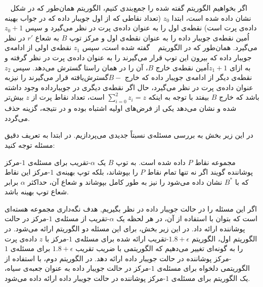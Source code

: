 اگر بخواهیم الگوریتم گفته شده را جمع‌بندی کنیم، الگوریتم همان‌طور که در شکل ~ نشان داده شده است،
 ابتدا $z_0$ (تعداد نقاطی که از اول جویبار داده که در جواب بهینه داده‌ی پرت است) نقطه‌ی اول را به عنوان داده‌ی پرت در نظر می‌گیرد و سپس $z_0 + 1$اُمین نقطه‌ی جویبار داده را به عنوان نقطه‌ی اول و مرکز توپ $B$ به شعاع $r'$ در نظر می‌گیرد.
همان‌طور که در الگوریتم ~ گفته شده است، سپس $z_1$ نقطه‌ی اولی از ادامه‌ی جویبار داده که بیرون این توپ قرار می‌گیرند را به عنوان داده‌ی پرت در نظر گرفته و به ازای $z_1+1$اُمین نقطه‌ی خارج $B$، آن را در همان راستا گسترش می‌دهد.
سپس $z_2$ نقطه‌ی دیگر از ادامه‌ی جویبار داده که خارج $B-$گسترش‌یافته قرار می‌گیرند را نیزبه عنوان داده‌ی پرت در نظر می‌گیرد، حال اگر نقطه‌ی دیگری در جویبارداده وجود داشته باشد که خارج $B$ بیفتد با توجه به اینکه $\sum_{i = 0}^{2} z_i = z$ است، تعداد نقاط پرت از $z$ بیش‌تر شده و نشان می‌دهد یکی از فرض‌های اولیه اشتباه بوده و در نتیجه، گزینه حذف می‌گردد.


در این زیر بخش به بررسی مسئله‌ی نسبتاً جدیدی می‌پردازیم.
در ابتدا به تعریف دقیق مسئله توجه کنید:


مجموعه نقاط $P$ داده شده است.
به توپ $B$ یک $\alpha$-تقریب برای مسئله‌ی $1$-مرکز پوشاننده گویند اگر نه تنها تمام نقاط $P$ را بپوشاند، بلکه توپ بهینه‌ی $1$-مرکز این نقاط که با $B^*$ نشان داده می‌شود را نیز به طور کامل بپوشاند و شعاع آن، حداکثر $\alpha$ برابر شعاع توپ بهینه باشد. 


اگر این مسئله را در حالت جویبار داده در نظر بگیریم, هدف نگه‌داری مجموعه هسته‌ای است که بتوان با استفاده از آن، در هر لحظه یک $\alpha$-تقریب از مسئله‌ی $1$-مرکز در حالت پوشاننده ارائه داد.
در این زیر بخش، برای این مسئله دو الگوریتم ارائه می‌شود.
در الگوریتم اول، الگوریتم $1.8 + \epsilon$-تقریب ارائه شده برای مسئله‌ی $1$-مرکز با $z$ داده‌ی پرت را به گونه‌ای تغییر می‌دهیم که الگوریتمی با ضریب تقریب $1.8 + \epsilon$ برای مسئله‌ی $1$-مرکز پوشاننده در حالت جویبار داده ارائه دهد.
در الگوریتم دوم، با استفاده از الگوریتمی دلخواه برای مسئله‌ی $1$-مرکز در حالت جویبار داده به عنوان جعبه‌ی سیاه، یک الگوریتم برای مسئله‌ی $1$-مرکز پوشاننده در حالت جویبار داده ارائه داده می‌شود.



